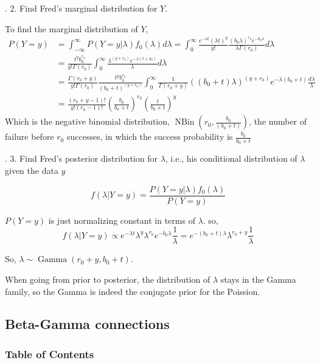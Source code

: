 \documentclass[8pt]{beamer}
\newcommand{\NBin}[2]{\operatorname{NBin}\!\left(#1,#2\right)}
\newcommand{\GammaDist}[2]{\operatorname{Gamma}\!\left(#1, #2\right)}
\begin{document}
\begin{frame}{.}
    2. Find Fred's marginal distribution for $Y$.

    To find the marginal distribution of $Y$,
    \[
    \begin{aligned}
        P(Y=y) &= \int_{-\infty}^\infty P(Y=y|\lambda) f_0(\lambda) d\lambda = \int_0^\infty \frac{e^{-\lambda t}(\lambda t)^y}{y!} \frac{(b_0 \lambda)^{r_0} e^{-b_0 \lambda}}{\lambda \Gamma(r_0)} d\lambda \\
        &= \frac{t^y b_0^{r_0}}{y! \Gamma(r_0)} \int_0^\infty \frac{\lambda^{(y + r_0)}e^{-\lambda(t + b_0)}}{\lambda} d\lambda \\
        &= \frac{\Gamma(r_0 + y)}{y! \Gamma(r_0)} \frac{t^y b_0^{r_0}}{(b_0 +t)^{(y+r_0)}} \int_0^\infty \frac{1}{\Gamma(r_0 + y)}((b_0 + t) \lambda)^{(y+r_0)} e^{-\lambda(b_0 + t)} \frac{d\lambda}{\lambda} \\
        &= \frac{(r_0 + y -1)!}{y! (r_0 -1)!} \left(\frac{b_0 }{b_0+t}\right)^{r_0} \left(\frac{t}{b_0 + t}\right)^{y}
    \end{aligned}
    \]
    Which is the negative binomial distribution, $\NBin{r_0}{\frac{b_0}{(b_0 + t)}}$, the number of failure before $r_0$ successes, in which the success probability is $\frac{b_0}{b_0+t}$
\end{frame}

\begin{frame}{.}
    3. Find Fred's posterior distribution for $\lambda$, i.e., his conditional distribution of $\lambda$ given the data $y$


    \[f(\lambda|Y=y) = \frac{P(Y=y|\lambda) f_0(\lambda)}{P(Y=y)} \]

    $P(Y=y)$ is just normalizing constant in terms of $\lambda$. so,
    \[
        f(\lambda | Y=y) \propto e^{-\lambda t} \lambda^{y} \lambda^{r_0} e^{-b_0 \lambda} \frac{1}{\lambda} = e^{-(b_0+t)\lambda} \lambda^{r_0+y} \frac{1}{\lambda}
    \]

    So, $\lambda \sim \GammaDist{r_0+y}{b_0 + t}$.

    When going from prior to posterior, the distribution of $\lambda$ stays in the Gamma family, so the Gamma is indeed the conjugate prior for the Poission.
\end{frame}

\subsection{Beta-Gamma connections}
\begingroup
    \begin{frame}
        \frametitle{Table of Contents}
        \tableofcontents[currentsubsection]
    \end{frame}
\endgroup
\end{document}
